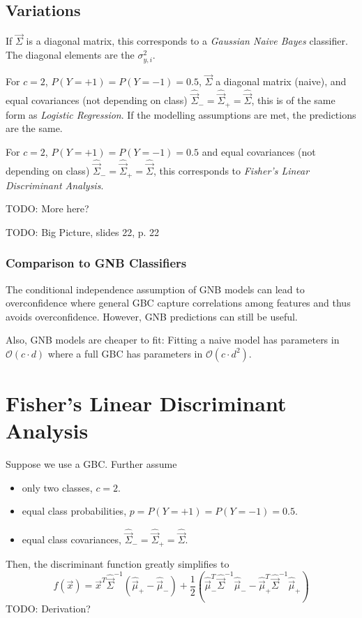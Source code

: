 \subsection{Variations}
If $\vec{\Sigma}$ is a diagonal matrix,
this corresponds to a
\emph{Gaussian Naive Bayes} classifier.
The diagonal elements are the
$\sigma^2_{y, i}$.

For $c = 2$, $P(Y = +1) = P(Y = -1) = 0.5$,
$\vec{\Sigma}$ a diagonal matrix (naive),
and equal covariances (not depending on class)
$\hat{\vec{\Sigma}}_- = \hat{\vec{\Sigma}}_+ = \hat{\vec{\Sigma}}$,
this is of the same form as \emph{Logistic Regression}.
If the modelling assumptions are met,
the predictions are the same.

For $c = 2$, $P(Y = +1) = P(Y = -1) = 0.5$
and equal covariances (not depending on class)
$\hat{\vec{\Sigma}}_- = \hat{\vec{\Sigma}}_+ = \hat{\vec{\Sigma}}$,
this corresponds to
\emph{Fisher's Linear Discriminant Analysis}.

TODO: More here?

TODO: Big Picture, slides 22, p. 22

\subsubsection{Comparison to GNB Classifiers}
The conditional independence assumption of
GNB models can lead to overconfidence
where general GBC capture correlations
among features and thus avoids overconfidence.
However, GNB predictions can still be useful.

Also, GNB models are cheaper to fit:
Fitting a naive model has parameters
in $\mathcal{O}(c \cdot d)$
where a full GBC has parameters
in $\mathcal{O}(c \cdot d^2)$.


\section{Fisher's Linear Discriminant Analysis}
Suppose we use a GBC.
Further assume
\begin{itemize}
	\item only two classes, $c = 2$.
	\item equal class probabilities,
	$p = P(Y = +1) = P(Y = -1) = 0.5$.
	\item equal class covariances,
	$\hat{\vec{\Sigma}}_- = \hat{\vec{\Sigma}}_+ = \hat{\vec{\Sigma}}$.
\end{itemize}

Then, the discriminant function greatly
simplifies to
\begin{equation*}
f(\vec{x}) = 
\vec{x}^T \hat{\vec{\Sigma}}^{-1}
(\hat{\vec{\mu}}_+ - \hat{\vec{\mu}}_-)
+ \frac{1}{2}
\left(
\hat{\vec{\mu}}_-^T \hat{\vec{\Sigma}}^{-1} \hat{\vec{\mu}}_-
-
\hat{\vec{\mu}}_+^T \hat{\vec{\Sigma}}^{-1} \hat{\vec{\mu}}_+
\right)
\end{equation*}
TODO: Derivation?

